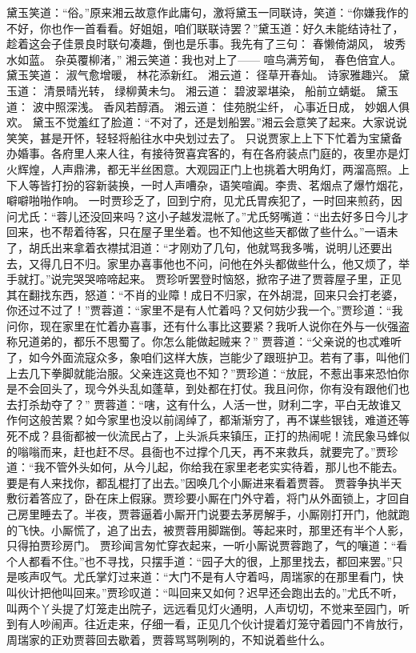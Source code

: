 \documentclass[12pt,oneside]{book}
\begin{document}
黛玉笑道：“俗。”原来湘云故意作此庸句，激将黛玉一同联诗，笑道：“你嫌我作的不好，你也作一首看看。好姐姐，咱们联联诗罢？”黛玉道：好久未能结诗社了，趁着这会子佳景良时联句凑趣，倒也是乐事。我先有了三句：
春懒倚湖风，
坡秀水如蓝。
杂英覆柳渚，”
湘云笑道：我也对上了——
喧鸟满芳甸，
春色倍宜人。
黛玉笑道：
淑气愈增暖，
林花添新红。
湘云道：
径草开春灿。
诗家雅趣兴。
黛玉道：
清景晴光转，
绿柳黄未匀。
湘云道：	
碧波翠堪染，
船前立蜻蜓。
黛玉道：
波中照深浅。
香风若醇酒。
湘云道：
佳苑脱尘纤，
心事近日成，
妙姻人俱欢。
黛玉不觉羞红了脸道：“不对了，还是划船罢。”湘云会意笑了起来。大家说说笑笑，甚是开怀，轻轻将船往水中央划过去了。
只说贾家上上下下忙着为宝黛备办婚事。各府里人来人往，有接待贺喜宾客的，有在各府装点门庭的，夜里亦是灯火辉煌，人声鼎沸，都无半丝困意。大观园正门上也挑着大明角灯，两溜高照。上下人等皆打扮的容新装换，一时人声嘈杂，语笑喧阗。李贵、茗烟点了爆竹烟花，噼噼啪啪作响。
一时贾珍乏了，回到宁府，见尤氏胃疾犯了，一时回来煎药，因问尤氏：“蓉儿还没回来吗？这小子越发混帐了。”尤氏努嘴道：“出去好多日今儿才回来，也不帮着待客，只在屋子里坐着。也不知他这些天都做了些什么。”一语未了，胡氏出来拿着衣襟拭泪道：“才刚劝了几句，他就骂我多嘴，说明儿还要出去，又得几日不归。家里办喜事他也不问，问他在外头都做些什么，他又烦了，举手就打。”说完哭哭啼啼起来。
贾珍听罢登时恼怒，掀帘子进了贾蓉屋子里，正见其在翻找东西，怒道：“不肖的业障！成日不归家，在外胡混，回来只会打老婆，你还过不过了！”贾蓉道：“家里不是有人忙着吗？又何妨少我一个。”贾珍道：“我问你，现在家里在忙着办喜事，还有什么事比这要紧？我听人说你在外与一伙强盗称兄道弟的，都乐不思蜀了。你怎么能做起贼来？”
贾蓉道：“父亲说的也忒难听了，如今外面流寇众多，象咱们这样大族，岂能少了跟班护卫。若有了事，叫他们上去几下拳脚就能治服。父亲连这竟也不知？”贾珍道：“放屁，不惹出事来恐怕你是不会回头了，现今外头乱如蓬草，到处都在打仗。我且问你，你有没有跟他们也去打杀劫夺了？”
贾蓉道：“嗐，这有什么，人活一世，财利二字，平白无故谁又作何这般苦累？如今家里也没以前阔绰了，都渐渐穷了，再不谋些银钱，难道还等死不成？县衙都被一伙流民占了，上头派兵来镇压，正打的热闹呢！流民象马蜂似的嗡嗡而来，赶也赶不尽。县衙也不过撑个几天，再不来救兵，就要完了。”贾珍道：“我不管外头如何，从今儿起，你给我在家里老老实实待着，那儿也不能去。要是有人来找你，都乱棍打了出去。”因唤几个小厮进来看着贾蓉。
贾蓉争执半天敷衍着答应了，卧在床上假寐。贾珍要小厮在门外守着，将门从外面锁上，才回自己房里睡去了。半夜，贾蓉逼着小厮开门说要去茅房解手，小厮刚打开门，他就跑的飞快。小厮慌了，追了出去，被贾蓉用脚踹倒。等起来时，那里还有半个人影，只得拍贾珍房门。
贾珍闻言匆忙穿衣起来，一听小厮说贾蓉跑了，气的嚷道：“看个人都看不住。”也不寻找，只摆手道：“园子大的很，上那里找去，都回来罢。”只是咳声叹气。尤氏掌灯过来道：“大门不是有人守着吗，周瑞家的在那里看门，快叫伙计把他叫回来。”贾珍叹道：“叫回来又如何？迟早还会跑出去的。”尤氏不听，叫两个丫头提了灯笼走出院子，远远看见灯火通明，人声切切，不觉来至园门，听到有人吵闹声。往近走来，仔细一看，正见几个伙计提着灯笼守着园门不肯放行，周瑞家的正劝贾蓉回去歇着，贾蓉骂骂咧咧的，不知说着些什么。
\end{document}
